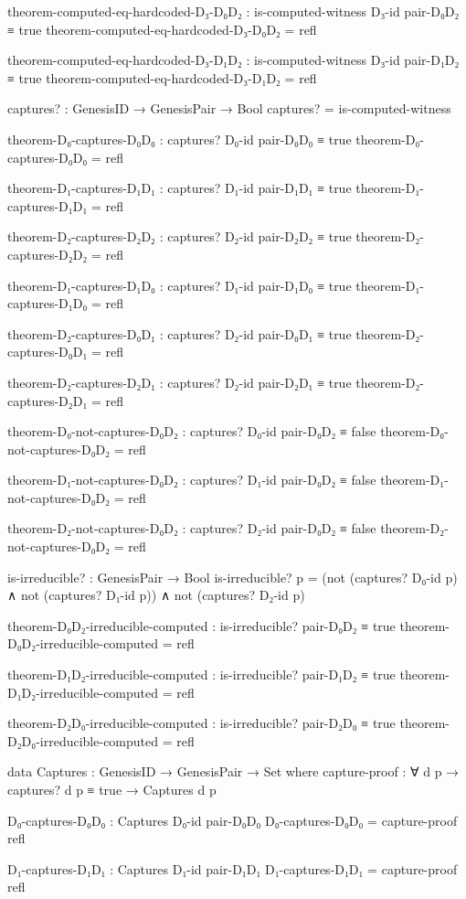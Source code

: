\documentclass[11pt,a4paper]{book}
\begin{document}
\begin{code}
theorem-computed-eq-hardcoded-D₃-D₀D₂ : is-computed-witness D₃-id pair-D₀D₂ ≡ true
theorem-computed-eq-hardcoded-D₃-D₀D₂ = refl

theorem-computed-eq-hardcoded-D₃-D₁D₂ : is-computed-witness D₃-id pair-D₁D₂ ≡ true
theorem-computed-eq-hardcoded-D₃-D₁D₂ = refl

captures? : GenesisID → GenesisPair → Bool
captures? = is-computed-witness

theorem-D₀-captures-D₀D₀ : captures? D₀-id pair-D₀D₀ ≡ true
theorem-D₀-captures-D₀D₀ = refl

theorem-D₁-captures-D₁D₁ : captures? D₁-id pair-D₁D₁ ≡ true
theorem-D₁-captures-D₁D₁ = refl

theorem-D₂-captures-D₂D₂ : captures? D₂-id pair-D₂D₂ ≡ true
theorem-D₂-captures-D₂D₂ = refl

theorem-D₁-captures-D₁D₀ : captures? D₁-id pair-D₁D₀ ≡ true
theorem-D₁-captures-D₁D₀ = refl

theorem-D₂-captures-D₀D₁ : captures? D₂-id pair-D₀D₁ ≡ true
theorem-D₂-captures-D₀D₁ = refl

theorem-D₂-captures-D₂D₁ : captures? D₂-id pair-D₂D₁ ≡ true
theorem-D₂-captures-D₂D₁ = refl

theorem-D₀-not-captures-D₀D₂ : captures? D₀-id pair-D₀D₂ ≡ false
theorem-D₀-not-captures-D₀D₂ = refl

theorem-D₁-not-captures-D₀D₂ : captures? D₁-id pair-D₀D₂ ≡ false
theorem-D₁-not-captures-D₀D₂ = refl

theorem-D₂-not-captures-D₀D₂ : captures? D₂-id pair-D₀D₂ ≡ false
theorem-D₂-not-captures-D₀D₂ = refl

is-irreducible? : GenesisPair → Bool
is-irreducible? p = (not (captures? D₀-id p) ∧ not (captures? D₁-id p)) ∧ not (captures? D₂-id p)

theorem-D₀D₂-irreducible-computed : is-irreducible? pair-D₀D₂ ≡ true
theorem-D₀D₂-irreducible-computed = refl

theorem-D₁D₂-irreducible-computed : is-irreducible? pair-D₁D₂ ≡ true
theorem-D₁D₂-irreducible-computed = refl

theorem-D₂D₀-irreducible-computed : is-irreducible? pair-D₂D₀ ≡ true
theorem-D₂D₀-irreducible-computed = refl

data Captures : GenesisID → GenesisPair → Set where
  capture-proof : ∀ {d p} → captures? d p ≡ true → Captures d p

D₀-captures-D₀D₀ : Captures D₀-id pair-D₀D₀
D₀-captures-D₀D₀ = capture-proof refl

D₁-captures-D₁D₁ : Captures D₁-id pair-D₁D₁
D₁-captures-D₁D₁ = capture-proof refl


\end{code}
\end{document}
